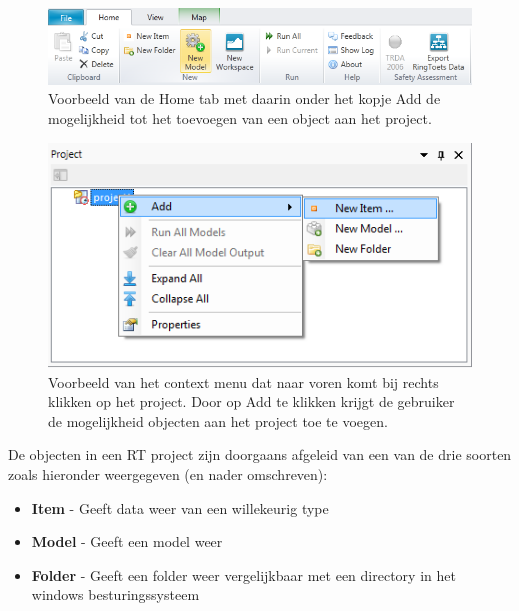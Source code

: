 \begin{figure}[H]
	\centering
		\includegraphics[width=1.0\textwidth]{figures/chapter_general/Home_Ribbon_Add_New_Model.png}
		\caption{Voorbeeld van de Home tab met daarin onder het kopje Add de mogelijkheid tot het toevoegen van een object aan het project.}
	\label{fig:rt_Add_Object}
\end{figure}
\begin{figure}[H]
	\centering
		\includegraphics{figures/chapter_general/rt_Add_Object_Project_Explorer.png}
		\caption{Voorbeeld van het context menu dat naar voren komt bij rechts klikken op het project. Door op Add te klikken krijgt de gebruiker de mogelijkheid objecten aan het project toe te voegen.}
	\label{fig:rt_Add_Object_Project_Explorer}
\end{figure}

De objecten in een RT project zijn doorgaans afgeleid van een van de drie soorten zoals hieronder weergegeven (en nader omschreven):
\begin{itemize}
\item \textbf{Item} - Geeft data weer van een willekeurig type
\item \textbf{Model} - Geeft een model weer
\item \textbf{Folder} - Geeft een folder weer vergelijkbaar met een directory in het windows besturingssysteem
\end{itemize}

